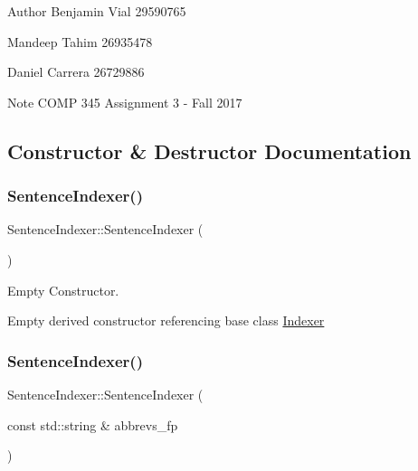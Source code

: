 \begin{DoxyAuthor}{Author}
Benjamin Vial 29590765 

Mandeep Tahim 26935478 

Daniel Carrera 26729886
\end{DoxyAuthor}
\begin{DoxyNote}{Note}
C\+O\+MP 345 Assignment 3 -\/ Fall 2017 
\end{DoxyNote}


\subsection{Constructor \& Destructor Documentation}
\mbox{\label{class_sentence_indexer_a2ec9f359954191ebc5d84c759fd2238d}} 
\subsubsection{\texorpdfstring{Sentence\+Indexer()}{SentenceIndexer()}\hspace{0.1cm}{\footnotesize\ttfamily [1/2]}}
{\footnotesize\ttfamily Sentence\+Indexer\+::\+Sentence\+Indexer (\begin{DoxyParamCaption}{ }\end{DoxyParamCaption})\hspace{0.3cm}{\ttfamily [inline]}}



Empty Constructor. 

Empty derived constructor referencing base class \hyperlink{class_indexer}{Indexer} \mbox{\label{class_sentence_indexer_a65a376d016bd9ff8a9f7c1f8521f2a1f}} 
\subsubsection{\texorpdfstring{Sentence\+Indexer()}{SentenceIndexer()}\hspace{0.1cm}{\footnotesize\ttfamily [2/2]}}
{\footnotesize\ttfamily Sentence\+Indexer\+::\+Sentence\+Indexer (\begin{DoxyParamCaption}\item[{const std\+::string \&}]{abbrevs\+\_\+fp }\end{DoxyParamCaption})\hspace{0.3cm}{\ttfamily [inline]}}



